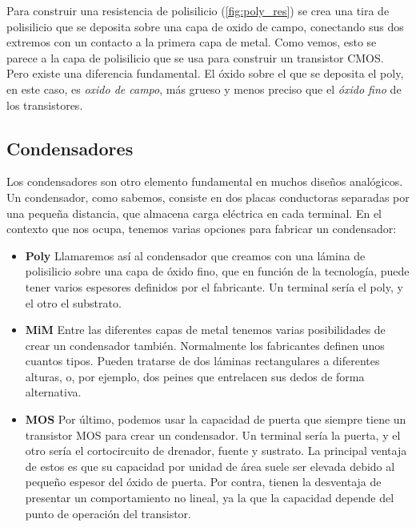 Para construir una resistencia de polisilicio (\ref{fig:poly_res}) se crea una tira de polisilicio
que se deposita sobre una capa de oxido de campo, conectando sus dos extremos con
un contacto a la primera capa de metal. Como vemos, esto se parece a la capa de
polisilicio que se usa para construir un transistor CMOS. Pero existe una diferencia
fundamental. El óxido sobre el que se deposita el poly, en este caso, es \textit{oxido de
campo}, más grueso y menos preciso que el \textit{óxido fino} de los transistores.\\

\subsection{Condensadores}\label{cap:condensadores}

Los condensadores son otro elemento fundamental en muchos diseños analógicos. Un
condensador, como sabemos, consiste en dos placas conductoras separadas por una pequeña
distancia, que almacena carga eléctrica en cada terminal.
En el contexto que nos ocupa, tenemos varias opciones para fabricar un condensador:\\

\begin{itemize}
	\item \textbf{Poly}
	Llamaremos así al condensador que creamos con una lámina de polisilicio sobre una
	capa de óxido fino, que en función de la tecnología, puede tener varios espesores
	definidos por el fabricante. Un terminal sería el poly, y el otro el substrato.

	\item \textbf{MiM}
	Entre las diferentes capas de metal tenemos varias posibilidades de crear un condensador
	también. Normalmente los fabricantes definen unos cuantos tipos. Pueden tratarse de
	dos láminas rectangulares a diferentes alturas, o, por ejemplo, dos peines que
	entrelacen sus dedos de forma alternativa.

	\item \textbf{MOS}
	Por último, podemos usar la capacidad de puerta que siempre tiene un transistor MOS
	para crear un condensador. Un terminal sería la puerta, y el otro sería el cortocircuito
	de drenador, fuente y sustrato. La principal ventaja de estos es que su capacidad por
	unidad de área suele ser elevada debido al pequeño espesor del óxido de puerta. Por contra,
	tienen la desventaja de presentar un comportamiento no lineal, ya la que la capacidad
	depende del punto de operación del transistor.
\end{itemize}

